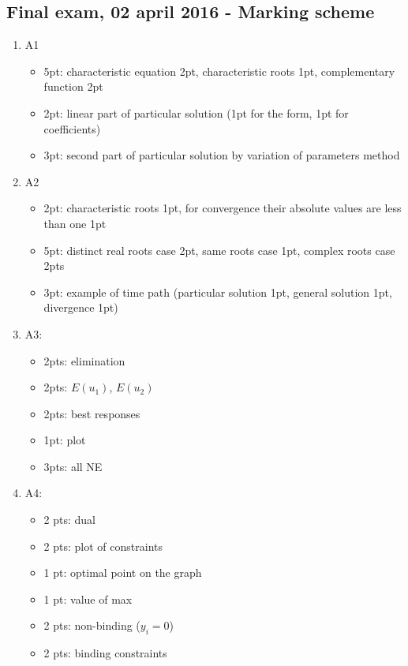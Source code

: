\documentclass[12pt]{article} %
\theoremstyle{definition} %
\begin{document}
\subsection{Final exam, 02 april 2016 - Marking scheme}

\begin{enumerate}
\item A1
\begin{itemize}
\item 5pt: characteristic equation 2pt, characteristic roots 1pt, complementary function 2pt
\item 2pt: linear part of particular solution (1pt for the form, 1pt for coefficients)
\item 3pt: second part of particular solution by variation of parameters method
\end{itemize}

\item A2
\begin{itemize}

\item 2pt: characteristic roots 1pt, for convergence their absolute values are less than one 1pt
\item 5pt: distinct real roots case 2pt, same roots case 1pt, complex roots case 2pts
\item 3pt: example of time path (particular solution 1pt, general solution 1pt, divergence 1pt)

\end{itemize}

\item A3:
\begin{itemize}
\item 2pts: elimination
\item 2pts: $E(u_1)$, $E(u_2)$
\item 2pts: best responses
\item 1pt: plot
\item 3pts: all NE
\end{itemize}

\item A4:
\begin{itemize}
\item 2 pts: dual
\item 2 pts: plot of constraints
\item 1 pt: optimal point on the graph
\item 1 pt: value of max
\item 2 pts: non-binding ($y_i=0$)
\item 2 pts: binding constraints
\end{itemize}


\end{enumerate}
\end{document}
